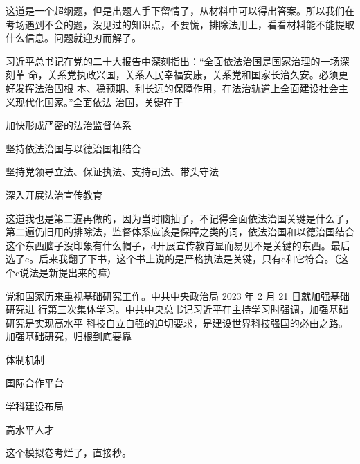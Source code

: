 \documentclass[lang=cn,blue,10pt,scheme=chinese,twocol]{zznote}
\begin{document}
\begin{postulate}
	这道是一个超纲题，但是出题人手下留情了，从材料中可以得出答案。所以我们在考场遇到不会的题，没见过的知识点，不要慌，排除法用上，看看材料能不能提取什么信息。问题就迎刃而解了。
\end{postulate}
\begin{exercise}习近平总书记在党的二十大报告中深刻指出：“全面依法治国是国家治理的一场深刻革 命，关系党执政兴国，关系人民幸福安康，关系党和国家长治久安。必须更好发挥法治固根 本、稳预期、利长远的保障作用，在法治轨道上全面建设社会主义现代化国家。”全面依法 治国，关键在于
	\begin{choice}
		\item 加快形成严密的法治监督体系
		\item 坚持依法治国与以德治国相结合
		\item 坚持党领导立法、保证执法、支持司法、带头守法
		\item 深入开展法治宣传教育
	\end{choice}
\end{exercise}
\begin{solution}
	这道我也是第二遍再做的，因为当时脑抽了，不记得全面依法治国关键是什么了，第二遍仍旧用的排除法，监督体系应该是保障之类的词，依法治国和以德治国结合这个东西脑子没印象有什么帽子，d开展宣传教育显而易见不是关键的东西。最后选了c。后来我翻了下书，这个书上说的是严格执法是关键，只有c和它符合。（这个c说法是新提出来的嘛）
\end{solution}


\begin{exercise}党和国家历来重视基础研究工作。中共中央政治局 2023 年 2 月 21 日就加强基础研究进 行第三次集体学习。中共中央总书记习近平在主持学习时强调，加强基础研究是实现高水平 科技自立自强的迫切要求，是建设世界科技强国的必由之路。加强基础研究，归根到底要靠
	\begin{choice}
		\item 体制机制
		\item 国际合作平台
		\item 学科建设布局
		\item 高水平人才
	\end{choice}
\end{exercise}
\begin{solution}
	这个模拟卷考烂了，直接秒。
\end{solution}
\end{document}

